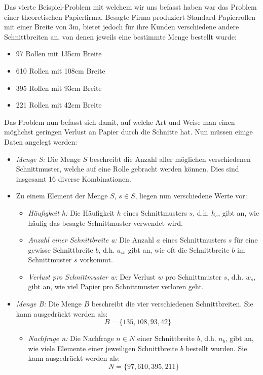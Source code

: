 Das vierte Beispiel-Problem mit welchem wir uns befasst haben war das Problem einer theoretischen Papierfirma. Besagte Firma produziert Standard-Papierrollen mit einer Breite von 3m, bietet jedoch für ihre Kunden verschiedene andere Schnittbreiten an, von denen jeweils eine bestimmte Menge bestellt wurde:
\begin{itemize}
\item 97 Rollen mit 135cm Breite
\item 610  Rollen mit 108cm Breite
\item 395  Rollen mit 93cm Breite
\item 221  Rollen mit 42cm Breite
\end{itemize}

Das Problem nun befasst sich damit, auf welche Art und Weise man einen möglichst geringen Verlust an Papier durch die Schnitte hat.
Nun müssen einige Daten angelegt werden:

\begin{itemize}
\item \emph{Menge S:} Die Menge $S$ beschreibt die Anzahl aller möglichen verschiedenen Schnittmuster, welche auf eine Rolle gebracht werden können. Dies sind insgesamt 16 diverse Kombinationen.
\item Zu einem Element der Menge $S$, $s \in S$, liegen nun verschiedene Werte vor:
\begin{itemize}
\item \emph{Häufigkeit h:} Die Häufigkeit $h$ eines Schnittmusters $s$, d.h. $h_s$, gibt an, wie häufig das besagte Schnittmuster verwendet wird.
\item \emph{Anzahl einer Schnittbreite a:}	Die Anzahl $a$ eines Schnittmusters $s$ für eine gewisse Schnittbreite $b$, d.h. $a_{sb}$ gibt an, wie oft die Schnittbreite $b$ im Schnittmuster $s$ vorkommt.
\item \emph{Verlust pro Schnittmuster w:} Der Verlust $w$ pro Schnittmuster $s$, d.h. $w_s$, gibt an, wie viel Papier pro Schnittmuster verloren geht.
\end{itemize}
\item \emph{Menge B:} Die Menge $B$ beschreibt die vier verschiedenen Schnittbreiten. Sie kann ausgedrückt werden als: 
\[ B = \{135,108,93,42\} \]
\begin{itemize}
\item \emph{Nachfrage n:} Die Nachfrage $n \in N$ einer Schnittbreite $b$, d.h. $n_b$, gibt an, wie viele Elemente einer jeweiligen Schnittbreite $b$ bestellt wurden. Sie kann ausgedrückt werden als: 
\[ N = \{97, 610, 395, 211\}\]
\end{itemize}
\end{itemize}

